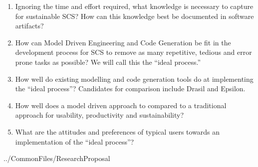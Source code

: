 \documentclass[12pt]{article}
\begin{document}
\begin{enumerate}
\item Ignoring the time and effort required, what knowledge is necessary to
  capture for sustainable SCS?  How can this knowledge best be documented in
  software artifacts?
\item How can Model Driven Engineering and Code Generation be fit in the
  development process for SCS to remove as many repetitive, tedious and error
  prone tasks as possible?  We will call this the ``ideal process.''
\item How well do existing modelling and code generation tools do at
  implementing the ``ideal process''?  Candidates for comparison include Drasil
  and Epsilon.
\item How well does a model driven approach to compared to a traditional
  approach for usability, productivity and sustainability?
\item What are the attitudes and preferences of typical users towards
  an implementation of the ``ideal process''?
\end{enumerate}


 {../CommonFiles/ResearchProposal}
\end{document}
